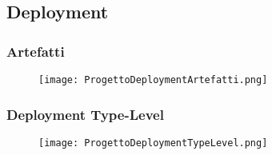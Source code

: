 



\subsection{Deployment}

\subsubsection{Artefatti}

\begin{figure}[h!]
    \begin{center}
        \texttt{[image: ProgettoDeploymentArtefatti.png]}
    \end{center}
\end{figure}

\subsubsection{Deployment Type-Level}

\begin{figure}[h!]
    \begin{center}
        \texttt{[image: ProgettoDeploymentTypeLevel.png]}
    \end{center}
\end{figure}
